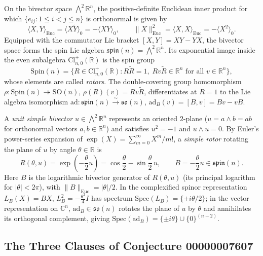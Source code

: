 \documentclass[11pt]{article}
\theoremstyle{definition}
\newcommand{\Cl}{\mathrm{Cl}}
\newcommand{\Spin}{\mathrm{Spin}}
\newcommand{\SO}{\mathrm{SO}}
\newcommand{\spinlie}{\mathfrak{spin}}
\newcommand{\solie}{\mathfrak{so}}
\newcommand{\Spec}{\mathrm{Spec}}
\newcommand{\ad}{\mathrm{ad}}
\newcommand{\Euc}{\mathrm{Euc}}
\newcommand{\rev}[1]{\widetilde{#1}}
\newcommand{\grade}[2]{\langle #1 \rangle_{#2}}
\begin{document}
On the bivector space $\bigwedge^2 \mathbb{R}^n$, the positive-definite Euclidean inner product
for which $\{e_{ij} : 1 \le i < j \le n\}$ is orthonormal is given by
\begin{equation}\label{eq:bivec-inner}
  \langle X, Y \rangle_{\Euc} = \grade{X \rev{Y}}{0} = -\grade{X Y}{0}, \qquad
  \|X\|_{\Euc}^2 = \langle X, X \rangle_{\Euc} = -\grade{X^2}{0}.
\end{equation}
Equipped with the commutator Lie bracket $[X, Y] = X Y - Y X$, the bivector space forms the
spin Lie algebra $\spinlie(n) = \bigwedge^2 \mathbb{R}^n$. Its exponential image inside the
even subalgebra $\Cl_{n,0}^+(\mathbb{R})$ is the spin group
\begin{equation}
  \Spin(n) = \{ R \in \Cl_{n,0}^+(\mathbb{R}) : R \rev{R} = 1, \;
  R v \rev{R} \in \mathbb{R}^n \text{ for all } v \in \mathbb{R}^n \},
\end{equation}
whose elements are called \emph{rotors}. The double-covering group homomorphism
$\rho : \Spin(n) \twoheadrightarrow \SO(n)$, $\rho(R)(v) = R v \rev{R}$, differentiates at
$R = 1$ to the Lie algebra isomorphism $\ad : \spinlie(n) \xrightarrow{\sim} \solie(n)$,
$\ad_B(v) = [B, v] = B v - v B$.

A \emph{unit simple bivector} $u \in \bigwedge^2 \mathbb{R}^n$ represents an oriented $2$-plane
($u = a \wedge b = a b$ for orthonormal vectors $a, b \in \mathbb{R}^n$) and satisfies
$u^2 = -1$ and $u \wedge u = 0$. By Euler's power-series expansion of
$\exp(X) = \sum_{m=0}^\infty X^m / m!$, a \emph{simple rotor} rotating the plane of $u$ by
angle $\theta \in \mathbb{R}$ is
\begin{equation}\label{eq:euler-rotor}
  R(\theta, u) = \exp\!\left(-\frac{\theta}{2} u\right)
  = \cos\frac{\theta}{2} - \sin\frac{\theta}{2}\, u,
  \qquad B = -\frac{\theta}{2} u \in \spinlie(n).
\end{equation}
Here $B$ is the logarithmic bivector generator of $R(\theta, u)$ (its principal logarithm for
$|\theta| < 2\pi$), with $\|B\|_{\Euc} = |\theta|/2$. In the complexified spinor representation
$L_B(X) = B X$, $L_B^2 = -\frac{\theta^2}{4} I$ has spectrum
$\Spec(L_B) = \{\pm i\theta/2\}$; in the vector representation on $\mathbb{C}^n$,
$\ad_B \in \solie(n)$ rotates the plane of $u$ by $\theta$ and annihilates its orthogonal
complement, giving $\Spec(\ad_B) = \{\pm i\theta\} \cup \{0\}^{(n-2)}$.

\subsection{The Three Clauses of Conjecture 00000007607}
\end{document}
